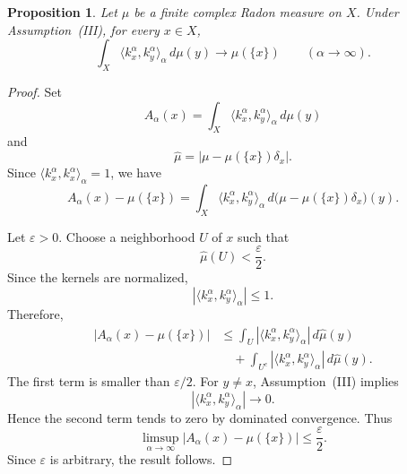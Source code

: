 \documentclass{amsart}
\newtheorem{prop}[thm]{Proposition}
\theoremstyle{definition}
\theoremstyle{remark}
\numberwithin{equation}{section}
\begin{document}
\begin{prop}\label{lkc}
Let $\mu$ be a finite complex Radon measure on $X$. Under
Assumption~(III), for every $x\in X$,
\[
\int_X
\langle k_x^\alpha,k_y^\alpha\rangle_\alpha\,d\mu(y)
\longrightarrow
\mu(\{x\})
\qquad
(\alpha\to\infty).
\]
\end{prop}

\begin{proof}
Set
\[
A_\alpha(x)
=
\int_X
\langle k_x^\alpha,k_y^\alpha\rangle_\alpha\,d\mu(y)
\]
and
\[
\widehat\mu
=
\left|\mu-\mu(\{x\})\delta_x\right|.
\]
Since $\langle k_x^\alpha,k_x^\alpha\rangle_\alpha=1$, we have
\[
A_\alpha(x)-\mu(\{x\})
=
\int_X
\langle k_x^\alpha,k_y^\alpha\rangle_\alpha
\,d\bigl(\mu-\mu(\{x\})\delta_x\bigr)(y).
\]

Let $\varepsilon>0$. Choose a neighborhood $U$ of $x$ such that
\[
\widehat\mu(U)<\frac{\varepsilon}{2}.
\]
Since the kernels are normalized,
\[
\left|\langle k_x^\alpha,k_y^\alpha\rangle_\alpha\right|
\leq 1.
\]
Therefore,
\[
\begin{aligned}
|A_\alpha(x)-\mu(\{x\})|
&\leq
\int_U
\left|\langle k_x^\alpha,k_y^\alpha\rangle_\alpha\right|
\,d\widehat\mu(y) \\
&\quad+
\int_{U^c}
\left|\langle k_x^\alpha,k_y^\alpha\rangle_\alpha\right|
\,d\widehat\mu(y).
\end{aligned}
\]
The first term is smaller than $\varepsilon/2$. For $y\neq x$,
Assumption~(III) implies
\[
\left|\langle k_x^\alpha,k_y^\alpha\rangle_\alpha\right|
\longrightarrow 0.
\]
Hence the second term tends to zero by dominated convergence. Thus
\[
\limsup_{\alpha\to\infty}
|A_\alpha(x)-\mu(\{x\})|
\leq \frac{\varepsilon}{2}.
\]
Since $\varepsilon$ is arbitrary, the result follows.
\end{proof}





\end{document}
